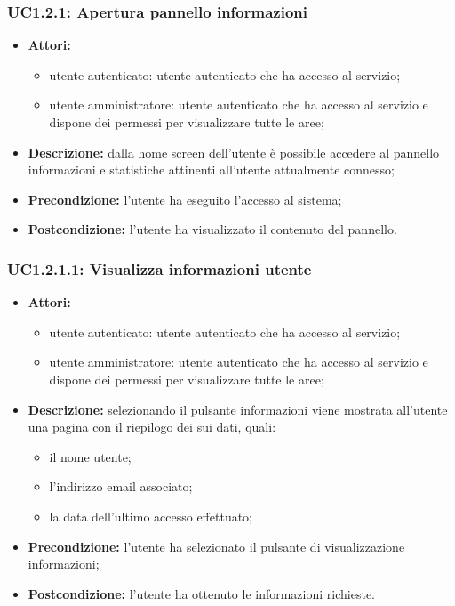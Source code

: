 \subsubsection{UC1.2.1: Apertura pannello informazioni}

\begin{itemize}
    \item \textbf{Attori:}
    \begin{itemize}
        \item utente autenticato: utente autenticato che ha accesso al servizio;
        \item utente amministratore: utente autenticato che ha accesso al servizio e dispone dei permessi per visualizzare tutte le aree;
    \end{itemize}
    \item \textbf{Descrizione:} dalla home screen dell'utente è possibile accedere al pannello informazioni e statistiche attinenti all'utente attualmente connesso;
    \item \textbf{Precondizione:} l'utente ha eseguito l'accesso al sistema;
    \item \textbf{Postcondizione:} l'utente ha visualizzato il contenuto del pannello.
\end{itemize}

\subsubsection{UC1.2.1.1: Visualizza informazioni utente}

\begin{itemize}
    \item \textbf{Attori:}
    \begin{itemize}
        \item utente autenticato: utente autenticato che ha accesso al servizio;
        \item utente amministratore: utente autenticato che ha accesso al servizio e dispone dei permessi per visualizzare tutte le aree;
    \end{itemize}
    \item \textbf{Descrizione:} selezionando il pulsante informazioni viene mostrata all'utente una pagina con il riepilogo dei sui dati, quali:
    \begin{itemize}
        \item il nome utente;
        \item l'indirizzo email associato;
        \item la data dell'ultimo accesso effettuato;
    \end{itemize}
    \item \textbf{Precondizione:} l'utente ha selezionato il pulsante di visualizzazione informazioni;
    \item \textbf{Postcondizione:} l'utente ha ottenuto le informazioni richieste.
\end{itemize}

